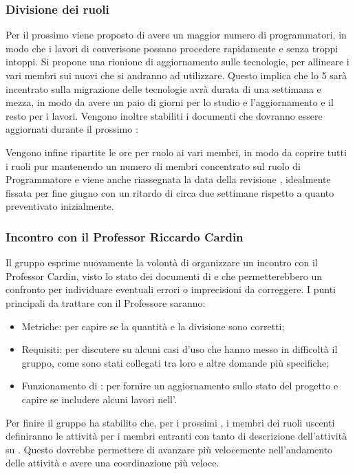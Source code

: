 \subsubsection{Divisione dei ruoli}
\par Per il prossimo  viene proposto di avere un maggior numero di programmatori, in modo che i lavori di converisone possano procedere rapidamente e senza troppi intoppi.
Si propone una rionione di aggiornamento sulle tecnologie, per allineare i vari membri sui nuovi  che si andranno ad utilizzare.
Questo implica che lo  5 sarà incentrato sulla migrazione delle tecnologie avrà durata di una settimana e mezza, in modo da avere un paio di giorni per lo studio e l'aggiornamento e il resto per i lavori.
Vengono inoltre stabiliti i documenti che dovranno essere aggiornati durante il prossimo :
Vengono infine ripartite le ore per ruolo ai vari membri, in modo da coprire tutti i ruoli pur mantenendo un numero di membri concentrato sul ruolo di Programmatore e viene anche riassegnata la data della revisione \RTB, idealmente fissata per fine giugno con un ritardo di circa due settimane rispetto a quanto preventivato inizialmente.

\subsubsection{Incontro con il Professor Riccardo Cardin}
\par Il gruppo esprime nuovamente la volontà di organizzare un incontro con il Professor Cardin, visto lo stato dei documenti di \AdR e \PdQ che permetterebbero un confronto per individuare eventuali errori o imprecisioni da correggere.
I punti principali da trattare con il Professore saranno:
\begin{itemize}
	\item Metriche: per capire se la quantità e la divisione sono corretti;
	\item Requisiti: per discutere su alcuni casi d'uso che hanno messo in difficoltà il gruppo, come sono stati collegati tra loro e altre domande più specifiche;
	\item Funzionamento di : per fornire un aggiornamento sullo stato del progetto e capire se includere alcuni lavori nell'\AdR.
\end{itemize}

Per finire il gruppo ha stabilito che, per i prossimi , i membri dei ruoli uscenti definiranno le attività per i membri entranti con tanto di descrizione dell'attività su . Questo dovrebbe permettere di avanzare più velocemente nell'andamento delle attività e avere una coordinazione più veloce. 
